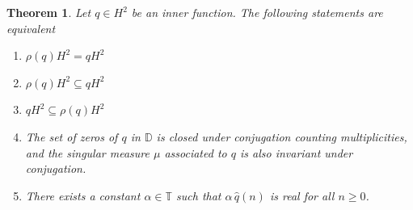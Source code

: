 \documentclass[a4paper,12pt]{amsart}
\def\D{{\mathbb{D}}}
\def\T{{\mathbb{T}}}
\newtheorem{theorem}{Theorem}[section]
\theoremstyle{definition}
\begin{document}
\begin{theorem}\label{unidim}
Let $q\in H^2$ be an inner function. The following statements are equivalent
\begin{enumerate}[label=(\roman*),ref=(\roman*)]
\item $\rho(q)H^2=qH^2$

\item $\rho(q)H^2\subseteq qH^2$

\item $qH^2\subseteq\rho(q)H^2$

\item The set of zeros of $q$ in $\D$ is closed under conjugation counting multiplicities, and the singular measure $\mu$ associated to $q$ is also invariant under conjugation.

\item There exists a constant $\alpha\in\T$ such that $\alpha\,\hat{q}(n)$ is real for all $n\geqslant0$. 
\end{enumerate}
\end{theorem}
\end{document}
